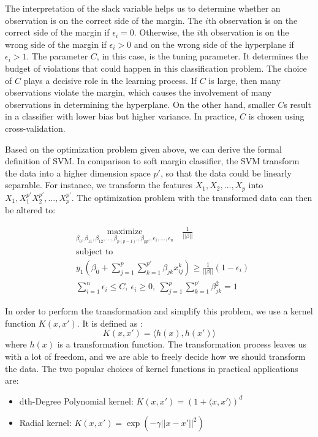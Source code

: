 The interpretation of the slack variable helps us to determine whether an observation is on the correct side of the margin.
The $i$th observation is on the correct side of the margin if $\epsilon_i = 0$. Otherwise, 
the $i$th observation is on the wrong side of the margin if $\epsilon_i > 0$ and on the wrong side of the hyperplane
if $\epsilon_i > 1$. The parameter $C$, in this case, is the tuning parameter. It determines the budget of violations
that could happen in this classification problem. The choice of $C$ plays a decisive role in the learning process.
If $C$ is large, then many observations violate the margin, which causes the involvement of many observations in 
determining the hyperplane. On the other hand, smaller $C$s result in a classifier with lower bias but higher variance.
In practice, $C$ is chosen using cross-validation. 

Based on the optimization problem given above, we can derive the formal definition of SVM. In comparison to 
soft margin classifier, the SVM transform the data into a higher dimension space $p'$, so that the data could be
linearly separable. For instance, we transform the features $X_1, X_2, ..., X_p$ into $X_1, X_1^{p'} X_2^{p'}, ..., X_p^{p'}$.
The optimization problem with the transformed data can then be altered to\cite{R9}: 

\begin{equation}
    \begin{aligned}
      & \underset{\textstyle {\beta_0, \beta_{11}, \beta_{12}, ..., \beta_{p(p-1)'}, \beta_{pp'}, \epsilon_1, ..., \epsilon_n}}{\text{maximize}} \quad
        \frac 1 {||\beta||}\\
      & \text{subject to} \\
      & y_1(\beta_0 + \sum_{j=1}^p \sum_{k=1}^{p'} \beta_{jk}x_{ij}^k )\geq \frac{1}{||\beta||} (1-\epsilon_i) \\
      & \sum_{i=1}^n\epsilon_i \leq C,\  \epsilon_i \geq 0, \ \sum_{j=1}^p\sum_{k=1}^{p'}\beta_{jk}^2 = 1
    \end{aligned}
\end{equation}

In order to perform the transformation and simplify this problem, we use a kernel function $K(x, x')$. It is defined as \cite{Elements12}:
\begin{equation}
    K(x, x') = \langle h(x), h(x') \rangle
\end{equation}
where $h(x)$ is a transformation function. 
The transformation process leaves us with a lot of freedom, and we are able to freely decide how we should transform the
data. The two popular choices of kernel functions in practical applications are:
\begin{itemize}
    \item dth-Degree Polynomial kernel: $K(x, x') = (1 + \langle x, x' \rangle)^d$
    \item Radial kernel: $K(x, x') = \exp(-\gamma ||x - x'||^2)$
\end{itemize}

